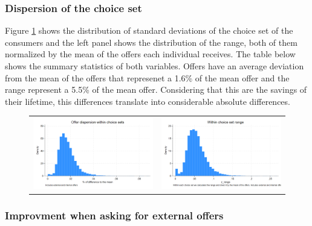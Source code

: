 \documentclass[12pt]{article}
\begin{document}
\subsubsection{Dispersion of the choice set}
Figure \ref{fig:ie3_5} shows the distribution of standard deviations of the choice set of the consumers and the left panel shows the distribution of the range, both of them normalized by the mean of the offers each individual receives.  The table below shows the summary statistics of both variables. Offers have an average deviation from the mean of the offers that represenet a 1.6\% of the mean offer and the range represent a 5.5\% of the mean offer. Considering that this are the savings of their lifetime, this differences translate into considerable absolute differences.
\begin{figure}[H] 
\caption{}
\label{fig:ie3_5}
\centering{}%
\begin{tabular}{cc}
\includegraphics[scale=0.26]{figures/IE3_dispertion_choice_set.png} & \includegraphics[scale=0.26]{figures/IE3_dispertion_choice_set_range.png}
\end{tabular}
\end{figure}





\subsubsection{Improvment when asking for external offers}


\end{document}
